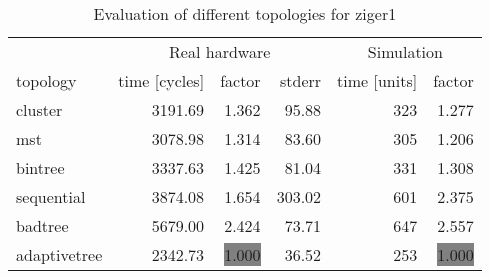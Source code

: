 \begin{table}[htb]
  \centering
  \begin{tabular}{lrrrrr}
  \toprule
  & \multicolumn{3}{c}{Real hardware} & \multicolumn{2}{c}{Simulation} \\
  topology & time [cycles] & factor & stderr & time [units] & factor \\
  \midrule
  cluster & 3191.69 & 1.362 & 95.88 & 323 & 1.277 \\
  mst & 3078.98 & 1.314 & 83.60 & 305 & 1.206 \\
  bintree & 3337.63 & 1.425 & 81.04 & 331 & 1.308 \\
  sequential & 3874.08 & 1.654 & 303.02 & 601 & 2.375 \\
  badtree & 5679.00 & 2.424 & 73.71 & 647 & 2.557 \\
  adaptivetree & 2342.73 & \colorbox{gray}{1.000} & 36.52 & 253 & \colorbox{gray}{1.000} \\
  \midrule
  \end{tabular}
  \caption{Evaluation of different topologies for ziger1}
  \label{tab:ziger1}
\end{table}
